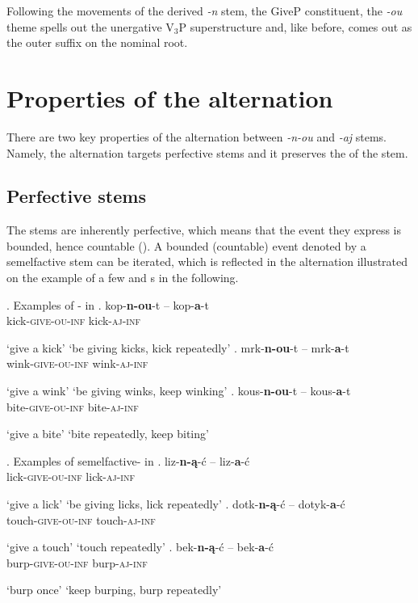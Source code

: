 \vskip -1cm
\noindent Following the movements of the derived \textit{-n} stem, the GiveP constituent, the \textit{-ou} theme spells out the unergative V$_{3}$P superstructure and, like before, comes out as the outer suffix on the nominal root.

\section{Properties of the alternation}

There are two key properties of the  alternation between \textit{-n-ou} and \textit{-aj} stems. Namely, the alternation targets perfective stems and it preserves the  of the stem. 

\subsection{Perfective stems}

The  stems are inherently perfective, which means that the event they express is bounded, hence countable (\citealt{Renat1979,Bach1986,deSwart1998,Willim2006,Dickey2016}). A bounded (countable) event denoted by a semelfactive stem can be iterated, which is reflected in the  alternation illustrated on the example of a few  and  s in the following. 

\ex. Examples of - in 
\ag. 
kop-\textbf{n-ou}-t -- kop-\textbf{a}-t\\
kick-\textsc{give-ou}-\textsc{inf} {} kick-\textsc{aj}-\textsc{inf}\\
\strut `give a kick' \hskip 32pt `be giving kicks, kick repeatedly'
\bg. 
mrk-\textbf{n-ou}-t -- mrk-\textbf{a}-t\\
wink-\textsc{give-ou}-\textsc{inf} {} wink-\textsc{aj}-\textsc{inf}\\
\strut `give a wink' \hskip 32pt `be giving winks, keep winking'
\cg.
kous-\textbf{n-ou}-t -- kous-\textbf{a}-t\\
bite-\textsc{give-ou}-\textsc{inf} {} bite-\textsc{aj}-\textsc{inf}\\
\strut `give a bite' \hskip 33pt `bite repeatedly, keep biting'

\ex. Examples of semelfactive- in \label{polisz}
\ag. 
liz-\textbf{n-\k{a}}-\'c -- liz-\textbf{a}-\'c\\
lick-\textsc{give-ou}-\textsc{inf} {} lick-\textsc{aj}-\textsc{inf}\\
\strut `give a lick' \hskip 32pt `be giving licks, lick repeatedly'
\bg. 
dotk-\textbf{n-\k{a}}-\'c -- dotyk-\textbf{a}-\'c\\
touch-\textsc{give-ou}-\textsc{inf} {} touch-\textsc{aj}-\textsc{inf}\\
\strut `give a touch' \hskip 32pt `touch repeatedly'
\cg.
bek-\textbf{n-\k{a}}-\'c -- bek-\textbf{a}-\'c\\
burp-\textsc{give-ou}-\textsc{inf} {} burp-\textsc{aj}-\textsc{inf}\\
\strut `burp once' \hskip 38pt `keep burping, burp repeatedly'




